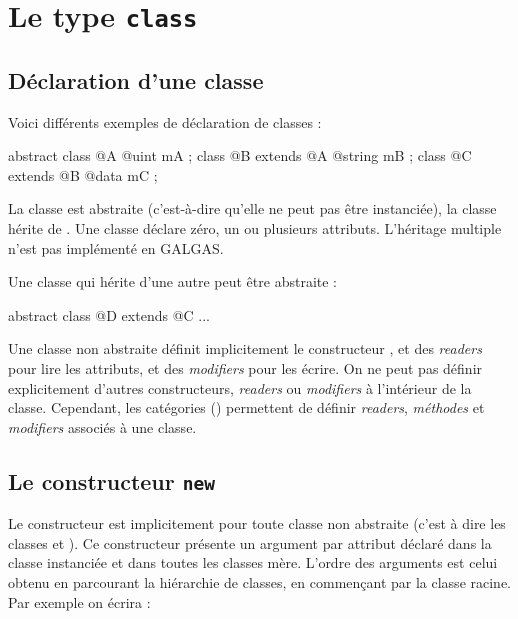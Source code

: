 
\chapter{Le type \texttt{class}}

\section{Déclaration d'une classe}

Voici différents exemples de déclaration de classes :

\begin{galgascode}
abstract class @A {
  @uint mA ;
}
class @B extends @A {
  @string mB ;
}
class @C extends @B {
  @data mC ;
}
\end{galgascode}

La classe  est abstraite (c'est-à-dire qu'elle ne peut pas être instanciée), la classe  hérite de . Une classe déclare zéro, un ou plusieurs attributs. L'héritage multiple n'est pas implémenté en GALGAS.

Une classe qui hérite d'une autre peut être abstraite :
\begin{galgascode}
abstract class @D extends @C {
  ...
 }
\end{galgascode}

Une classe non abstraite définit implicitement le constructeur , et des \emph{readers} pour lire les attributs, et des \emph{modifiers} pour les écrire. On ne peut pas définir explicitement d'autres constructeurs, \emph{readers} ou \emph{modifiers} à l'intérieur de la classe. Cependant,  les catégories () permettent de définir \emph{readers}, \emph{méthodes} et \emph{modifiers} associés à une classe.












\section{Le constructeur \texttt{new}}

Le constructeur  est implicitement pour toute classe non abstraite (c'est à dire les classes  et ). Ce constructeur présente un argument par attribut déclaré dans la classe instanciée et dans toutes les classes mère. L'ordre des arguments est celui obtenu en parcourant la hiérarchie de classes, en commençant par la classe racine. Par exemple on écrira :

